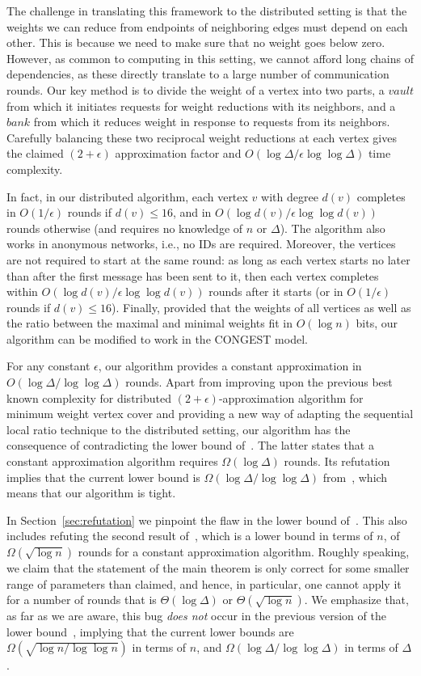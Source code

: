 \documentclass[11pt]{article}
\newcommand{\Vault}{vault}
\newcommand{\Bank}{bank}
\begin{document}
The challenge in translating this framework to the distributed setting is that the weights we can reduce from endpoints of neighboring edges must depend on each other. This is because we need to make sure that no weight goes below zero. However, as common to computing in this setting, we cannot afford long chains of dependencies, as these directly translate to a large number of communication rounds. Our key method is to divide the weight of a vertex into two parts, a $\Vault$ from which it initiates requests for weight reductions with its neighbors, and a $\Bank$ from which it reduces weight in response to requests from its neighbors. Carefully balancing these two reciprocal weight reductions at each vertex gives the claimed $(2+\epsilon)$ approximation factor and $O(\log{\Delta}/\epsilon\log\log{\Delta})$ time complexity.

In fact, in our distributed algorithm, each vertex $v$ with degree $d(v)$ completes in $O(1/\epsilon)$ rounds if $d(v)\leq 16$, and in $O(\log{d(v)}/\epsilon\log\log{d(v)})$ rounds otherwise (and requires no knowledge of $n$ or $\Delta$). The algorithm also works in anonymous networks, i.e., no IDs are required. Moreover, the vertices are not required to start at the same round: as long as each vertex starts no later than after the first message has been sent to it, then each vertex completes within $O(\log{d(v)}/\epsilon\log\log{d(v)})$ rounds after it starts (or in $O(1/\epsilon)$ rounds if $d(v)\leq 16$).
Finally, provided that the weights of all vertices as well as the ratio between the maximal and minimal weights fit in $O(\log{n})$ bits, our algorithm can be modified to work in the CONGEST model.

For any constant $\epsilon$, our algorithm provides a constant approximation in $O(\log{\Delta}/\log\log{\Delta})$ rounds. Apart from improving upon the previous best known complexity for distributed $(2+\epsilon)$-approximation algorithm for minimum weight vertex cover and providing a new way of adapting the sequential local ratio technique to the distributed setting, our algorithm has the consequence of contradicting the lower bound of~\cite{KMW10}. The latter states that a constant approximation algorithm requires $\Omega(\log{\Delta})$ rounds. Its refutation implies that the current lower bound is $\Omega(\log{\Delta}/\log\log{\Delta})$ from~\cite{KMW04}, which means that our algorithm is tight.

In Section~\ref{sec:refutation} we pinpoint the flaw in the lower bound of~\cite{KMW10}. This also includes refuting the second result of~\cite{KMW10}, which is a lower bound in terms of $n$, of $\Omega(\sqrt{\log{n}})$ rounds for a constant approximation algorithm. Roughly speaking, we claim that the statement of the main theorem is only correct for some smaller range of parameters than claimed, and hence, in particular, one cannot apply it for a number of rounds that is $\Theta(\log{\Delta})$ or $\Theta(\sqrt{\log{n}})$.
We emphasize that, as far as we are aware, this bug \emph{does not} occur in the previous version of the lower bound~\cite{KMW04}, implying that the current lower bounds are $\Omega(\sqrt{\log{n}/\log\log{n}})$ in terms of $n$, and $\Omega(\log{\Delta}/\log\log{\Delta})$ in terms of $\Delta$.
\end{document}
